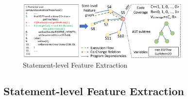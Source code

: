 

\begin{figure}[t]
	\centering
	\includegraphics[width=3.4in]{graphs/step-1-statement.png}
	\caption{Statement-level Feature Extraction}
	\label{statement-level-feature-extraction}
\end{figure}

\subsection{Statement-level Feature Extraction}

